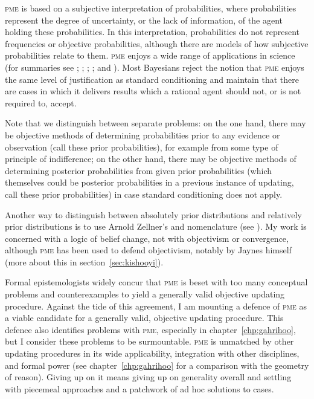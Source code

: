 \documentclass[phd,12pt,oneside]{ubcthesis}
\begin{document}
\textsc{pme} is based on a subjective interpretation of probabilities,
where probabilities represent the degree of uncertainty, or the lack
of information, of the agent holding these probabilities. In this
interpretation, probabilities do not represent frequencies or
objective probabilities, although there are models of how subjective
probabilities relate to them. \textsc{pme} enjoys a wide range of
applications in science (for summaries see
; ;
; ; and
). Most Bayesians reject the notion that
\textsc{pme} enjoys the same level of justification as standard
conditioning and maintain that there are cases in which it delivers
results which a rational agent should not, or is not required to,
accept.

Note that we distinguish between separate problems: on the one hand,
there may be objective methods of determining probabilities prior to
any evidence or observation (call these  prior
probabilities), for example from some type of principle of
indifference; on the other hand, there may be objective methods of
determining posterior probabilities from given prior probabilities
(which themselves could be posterior probabilities in a previous
instance of updating, call these  prior
probabilities) in case standard conditioning does not apply.

Another way to distinguish between absolutely prior distributions and
relatively prior distributions is to use Arnold Zellner's
 and  nomenclature (see
). My work is concerned with a logic of belief
change, not with objectivism or convergence, although \textsc{pme} has
been used to defend objectivism, notably by Jaynes himself (more about
this in section~\ref{sec:kishooyi}).

Formal epistemologists widely concur that \textsc{pme} is beset with
too many conceptual problems and counterexamples to yield a generally
valid objective updating procedure. Against the tide of this
agreement, I am mounting a defence of \textsc{pme} as a viable
candidate for a generally valid, objective updating procedure. This
defence also identifies problems with \textsc{pme}, especially in
chapter~\ref{chp:gahrihoo}, but I consider these problems to be
surmountable. \textsc{pme} is unmatched by other updating procedures
in its wide applicability, integration with other disciplines, and
formal power (see chapter~\ref{chp:gahrihoo} for a comparison with the
geometry of reason). Giving up on it means giving up on generality
overall and settling with piecemeal approaches and a patchwork of ad
hoc solutions to cases.
\end{document}
